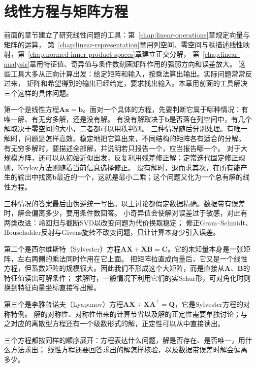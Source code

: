 \chapter{线性方程与矩阵方程}
\label{chap:linear-equations-and-optimization}
\label{sec:linear-algebra-reachability-solvability}

前面的章节建立了研究线性问题的工具：第~\ref{chap:linear-operations}章规定向量与矩阵的运算，
第~\ref{chap:linear-representation}章用列空间、零空间与秩描述线性映射，第~\ref{chap:normed-inner-product-spaces}章建立正交分解，
第~\ref{chap:linear-analysis}章用特征值、奇异值与条件数刻画矩阵作用的强弱方向和误差放大。
这些工具大多从正向计算出发：给定矩阵和输入，按乘法算出输出。实际问题常常反过来，
矩阵和希望得到的输出已经给定，要求找出输入。本章用前面的工具解决三个这样的具体问题。

第一个是线性方程$\bm A\bm x=\bm b$。面对一个具体的方程，先要判断它属于哪种情况：有唯一解、有无穷多解，还是没有解。
有没有解取决于$\bm b$是否落在列空间中，有几个解取决于零空间的大小，二者都可以用秩判别。
三种情况随后分别处理。有唯一解时，问题是怎样高效、稳定地把它算出来，不同结构的矩阵各有适合的分解。
有无穷多解时，要描述全部解，并说明若只报告一个，应当报告哪一个。
对于大规模方阵，还可以从初始近似出发，反复利用残差修正解；定常迭代固定修正规则，Krylov方法则随着当前信息选择修正。
没有解时，退而求其次，在所有能产生的输出中找离$\bm b$最近的一个，这就是最小二乘；这个问题又化为一个总有解的线性方程。

三种情况的答案最后由伪逆统一写出。以上讨论都假定数据精确。数据带有误差时，解会偏离多少，要用条件数回答。
小奇异值会使解对误差过于敏感，对此有两类改进：岭回归与截断SVD以改变问题为代价换取稳定；
修正Gram--Schmidt、Householder反射与Givens旋转不改变问题，只让计算本身少引入误差。

第二个是西尔维斯特（Sylvester）方程$\bm A\bm X+\bm X\bm B=\bm C$。它的未知量本身是一张矩阵，左右两侧的乘法同时作用在它上面。
把矩阵拉直成向量后，它又是一个线性方程，但系数矩阵的规模很大。因此我们不形成这个大矩阵，而是直接从$\bm A$、$\bm B$的特征值读出可解条件；
求解时，一般情况下利用它们的实Schur形，可对角化时则换到特征向量坐标直接写出解。

第三个是李雅普诺夫（Lyapunov）方程$\bm A\bm X+\bm X\bm A^\top=\bm Q$，它是Sylvester方程的对称特例。
解的对称性、对称性带来的计算节省以及解的正定性需要单独讨论；与之对应的离散型方程还有一个级数形式的解，正定性可以从中直接读出。

三个方程都按同样的顺序展开：方程表达什么问题，解是否存在、是否唯一，用什么方法求出；
线性方程还要回答求出的解怎样核验，以及数据带误差时解会偏离多少。

